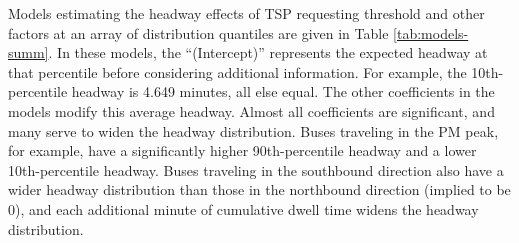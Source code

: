 \documentclass[3p, authoryear, review]{elsarticle} %
\begin{document}
Models estimating the headway effects of TSP requesting threshold and other factors
at an array of distribution quantiles are given in Table \ref{tab:models-summ}.
In these models, the ``(Intercept)'' represents the expected headway at that percentile
before considering additional information. For example, the 10th-percentile headway
is 4.649 minutes, all else equal. The other
coefficients in the models modify this average headway. Almost all coefficients are
significant, and many serve to widen the headway distribution.
Buses traveling in the PM peak, for example, have a significantly higher
90th-percentile headway and a lower 10th-percentile headway. Buses traveling in the
southbound direction also have a wider headway distribution than those in the
northbound direction (implied to be \(0\)), and each additional minute of cumulative dwell
time widens the headway distribution.
\end{document}
